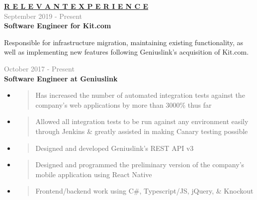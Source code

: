 \documentclass[letterpage]{article}
\begin{document}
\begin{minipage}[t]{0.61\linewidth}
\vspace{0pt}
\textbf{\fontsize{14px}{1px}\selectfont
  \ul{R E L E V A N T \:\: E X P E R I E N C E}
}\\

\vspace{7px}
\textcolor{gray}{September 2019 - Present}\\
\textbf{\textsf{Software Engineer for Kit.com}}\\
\raggedright
Responsible for infrastructure migration,
maintaining existing functionality, as well as implementing
new features following Geniuslink's acquisition of Kit.com.

\vspace{7px}
\textcolor{gray}{October 2017 - Present}\\
\textbf{\textsf{Software Engineer at Geniuslink}}
\begin{itemize}[leftmargin=*,labelindent=1mm,labelsep=0mm]
\item
  \begin{quote}
  \raggedright
  Has increased the number of automated integration tests
  against the company's web applications by more than 3000\% thus far
  \end{quote}
\item
  \begin{quote}
  \raggedright
  Allowed all integration tests to be run against any
  environment easily through Jenkins \& greatly
  assisted in making Canary testing possible
  \end{quote}
\item
  \begin{quote}
  \raggedright
  Designed and developed Geniuslink's REST API v3
  \end{quote}
\item
  \begin{quote}
  \raggedright
  Designed and programmed the preliminary version of the company's mobile
  application using React Native
  \end{quote}
\item
  \begin{quote}
  \raggedright
  Frontend/backend work using C\#, Typescript/JS,
  jQuery, \& Knockout
  \end{quote}
\end{itemize}


\end{minipage}
\end{document}
